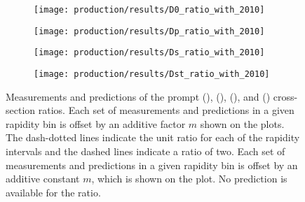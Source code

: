 \begin{figure}
  \begin{subfigure}[b]{0.5\textwidth}
    \centering
    \texttt{[image: production/results/D0\_ratio\_with\_2010]}
    \caption{\PDzero}
    \label{fig:prod:results:ratio_7tev:D0}
  \end{subfigure}
  \begin{subfigure}[b]{0.5\textwidth}
    \centering
    \texttt{[image: production/results/Dp\_ratio\_with\_2010]}
    \caption{\PDplus}
    \label{fig:prod:results:ratio_7tev:Dp}
  \end{subfigure}
  \begin{subfigure}[b]{0.5\textwidth}
    \centering
    \texttt{[image: production/results/Ds\_ratio\_with\_2010]}
    \caption{\PDsplus}
    \label{fig:prod:results:ratio_7tev:Ds}
  \end{subfigure}
  \begin{subfigure}[b]{0.5\textwidth}
    \centering
    \texttt{[image: production/results/Dst\_ratio\_with\_2010]}
    \caption{\PDstarp}
    \label{fig:prod:results:ratio_7tev:Dst}
  \end{subfigure}
  \caption{%
    Measurements and predictions of the prompt \PDzero 
    (), \PDplus 
    (), \PDsplus 
    (), and \PDstarp 
    () cross-section ratios.
    Each set of measurements and predictions in a given rapidity bin is offset 
    by an additive factor $m$ shown on the plots.
    The dash-dotted lines indicate the unit ratio for each of the rapidity 
    intervals and the dashed lines indicate a ratio of two.
    Each set of measurements and predictions in a given rapidity bin is 
    offset by an additive constant $m$, which is shown on the plot.
    No prediction is available for the \PDsplus ratio.
  }
  \label{fig:prod:results:ratio_7tev}
\end{figure}

